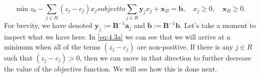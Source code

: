 \documentclass[12pt,english]{article}
\begin{document}
\begin{subequations}\label{eq:4.3a}
\begin{equation}
\min z_0 - \sum_{j \in R} (z_j - c_j) x_j
\end{equation}
subject to
\begin{equation}\label{eq:4.3b}
\sum_{j \in R} \mathbf{y}_jx_j + \mathbf{x}_B = \overline{\mathbf{b}}, \quad x_j \geq 0, \quad \mathbf{x}_B \geq 0.
\end{equation}
\end{subequations}
For brevity, we have denoted $\mathbf{y}_j := \mathbf{B}^{-1} \mathbf{a}_j$ and $\overline{\mathbf{b}}:= \mathbf{B}^{-1}\mathbf{b}$.  Let's take a moment to inspect what we have here.  In \eqref{eq:4.3a} we can see that we will arrive at a minimum when all of the terms $(z_j - c_j)$ are non-positive.  If there is any $j \in R$ such that $(z_j - c_j) >0$, then we can move in that direction to further decrease the value of the objective function.  We will see how this is done next. \\
\end{document}
